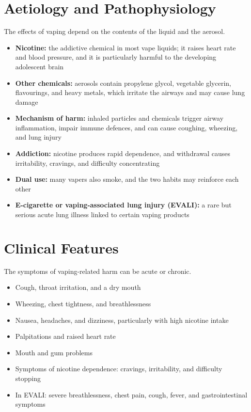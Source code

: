 \section*{Aetiology and Pathophysiology}
The effects of vaping depend on the contents of the liquid and the aerosol.
\begin{itemize}
    \item \textbf{Nicotine:} the addictive chemical in most vape liquids; it raises heart rate and blood pressure, and it is particularly harmful to the developing adolescent brain
    \item \textbf{Other chemicals:} aerosols contain propylene glycol, vegetable glycerin, flavourings, and heavy metals, which irritate the airways and may cause lung damage
    \item \textbf{Mechanism of harm:} inhaled particles and chemicals trigger airway inflammation, impair immune defences, and can cause coughing, wheezing, and lung injury
    \item \textbf{Addiction:} nicotine produces rapid dependence, and withdrawal causes irritability, cravings, and difficulty concentrating
    \item \textbf{Dual use:} many vapers also smoke, and the two habits may reinforce each other
    \item \textbf{E-cigarette or vaping-associated lung injury (EVALI):} a rare but serious acute lung illness linked to certain vaping products
\end{itemize}

\section*{Clinical Features}
The symptoms of vaping-related harm can be acute or chronic.
\begin{itemize}
    \item Cough, throat irritation, and a dry mouth
    \item Wheezing, chest tightness, and breathlessness
    \item Nausea, headaches, and dizziness, particularly with high nicotine intake
    \item Palpitations and raised heart rate
    \item Mouth and gum problems
    \item Symptoms of nicotine dependence: cravings, irritability, and difficulty stopping
    \item In EVALI: severe breathlessness, chest pain, cough, fever, and gastrointestinal symptoms
\end{itemize}

